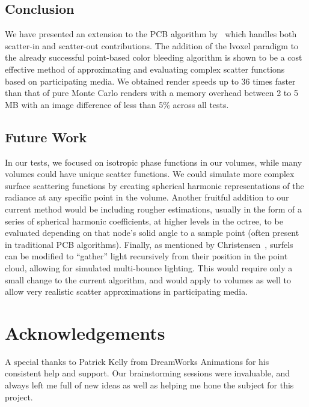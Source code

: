 \documentclass[runningheads]{llncs}
\begin{document}
\subsection{Conclusion}

We have presented an extension to the PCB algorithm by~\cite{christensen:2008} which handles both scatter-in and scatter-out contributions.  The addition of the lvoxel paradigm to the already successful point-based color bleeding algorithm is shown to be a cost effective method of approximating and evaluating complex scatter functions based on participating media.  We obtained render speeds up to 36 times faster than that of pure Monte Carlo renders with a memory overhead between 2 to 5 MB with an image difference of less than 5\% across all tests.

\subsection{Future Work}

In our tests, we focused on isotropic phase functions in our volumes, while many volumes could have unique scatter functions.  We could simulate more complex surface scattering functions by creating spherical harmonic representations of the radiance at any specific point in the volume.  %
Another fruitful addition to our current method would be including rougher estimations, usually in the form of a series of spherical harmonic coefficients, at higher levels in the octree, to be evaluated depending on that node's solid angle to a sample point (often present in traditional PCB algorithms). Finally, as mentioned by Christensen~\cite{christensen:2008}, surfels can be modified to ``gather'' light recursively from their position in the point cloud, allowing for simulated multi-bounce lighting.  This would require only a small change to the current algorithm, and would apply to volumes as well to allow very realistic scatter approximations in participating media.


\section*{Acknowledgements}
A special thanks to Patrick Kelly from DreamWorks Animations for his consistent help and support.  Our brainstorming sessions were invaluable, and always left me full of new ideas as well as helping me hone the subject for this project.
\end{document}
